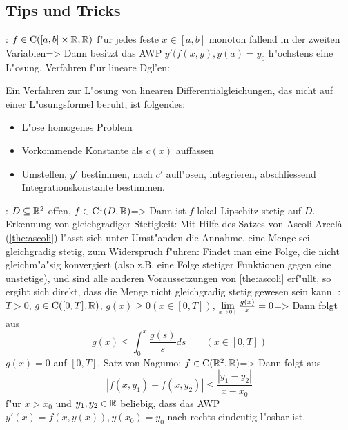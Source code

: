 \subsection{Tips und Tricks}
\theorem:
  $f\in{\rm C}([a,b]\times\mathbb R,\mathbb R)$ f"ur jedes feste $x\in[a,b]$ 
  monoton fallend in der zweiten Variablen=>{
  Dann besitzt das AWP $y'(f(x,y),y(a)=y_0$ h"ochstens eine L"osung.
  }
\trick Verfahren f"ur lineare Dgl'en:{
  Ein Verfahren zur L"osung von linearen Differentialgleichungen, 
  das nicht auf einer L"osungsformel beruht, ist folgendes:
  \begin{itemize}
    \item L"ose homogenes Problem
    \item Vorkommende Konstante als $c(x)$ auffassen
    \item Umstellen, $y'$ bestimmen, nach $c'$ aufl"osen, integrieren,
      abschliessend Integrationskonstante bestimmen.
    \end{itemize}
  }
\theorem: $D\subseteq\mathbb R^2$ offen, $f\in{\rm C}^1(D,\mathbb R)$=>{
  Dann ist $f$ lokal Lipschitz-stetig auf $D$.
  }
\trick Erkennung von gleichgradiger Stetigkeit:{
  Mit Hilfe des Satzes von Ascoli-Arcel\`a (\ref{the:ascoli}) l"asst sich
  unter Umst"anden die Annahme, eine Menge sei gleichgradig stetig, zum
  Widerspruch f"uhren: Findet man eine Folge, die nicht gleichm"a"sig
  konvergiert (also z.B. eine Folge stetiger Funktionen gegen eine unstetige),
  und sind alle anderen Voraussetzungen von \ref{the:ascoli} erf"ullt, so
  ergibt sich direkt, dass die Menge nicht gleichgradig stetig gewesen
  sein kann.  
  }
\theorem:
  $T>0$, $g\in{\rm C}([0,T],\mathbb R)$, $g(x)\ge 0 (x\in[0,T])$, 
  $\limes x->{0+} \frac {g(x)}x=0$=>{
  Dann folgt aus
  \[g(x)\le \int_0^x \frac{g(s)}sds \qquad (x\in[0,T])
    \]
  $g(x)=0$ auf $[0,T]$.
  }
\theorem Satz von Nagumo:
  $f\in{\rm C}(\mathbb R^2,\mathbb R)$=>{
  Dann folgt aus
  \[|f(x,y_1)-f(x,y_2)|\le \frac{|y_1-y_2|}{x-x_0}
    \]
  f"ur $x>x_0$ und $y_1,y_2\in\mathbb R$ beliebig, dass das AWP
  $y'(x)=f(x,y(x)),y(x_0)=y_0$ nach rechts eindeutig l"osbar ist.
  }